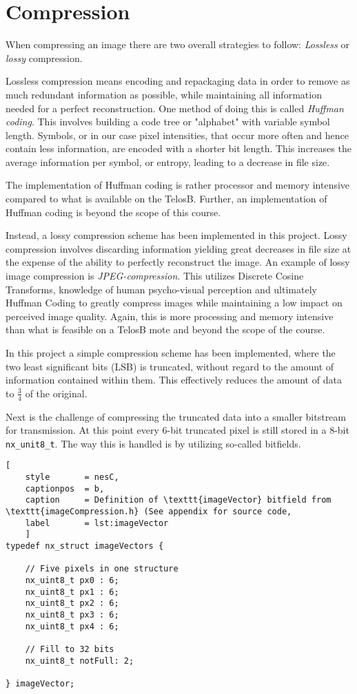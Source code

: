 \section{Compression}
When compressing an image there are two overall strategies to follow:
\emph{Lossless} or \emph{lossy} compression.

Lossless compression means encoding and repackaging data in order to remove as much redundant information as possible, while maintaining all information needed for a perfect reconstruction. 
One method of doing this is called \emph{Huffman coding}.
This involves building a code tree or "alphabet" with variable symbol length.
Symbols, or in our case pixel intensities, that occur more often and hence contain less information, are encoded with a shorter bit length. 
This increases the average information per symbol, or entropy, leading to a decrease in file size.

The implementation of Huffman coding is rather processor and memory intensive compared to what is available on the TelosB.
Further, an implementation of Huffman coding is beyond the scope of this course.

Instead, a lossy compression scheme has been implemented in this project.
Lossy compression involves discarding information yielding great decreases in file size at the expense of the ability to perfectly reconstruct the image.
An example of lossy image compression is \emph{JPEG-compression}.
This utilizes Discrete Cosine Transforms, knowledge of human psycho-visual perception and ultimately Huffman Coding to greatly compress images while maintaining a low impact on perceived image quality.
Again, this is more processing and memory intensive than what is feasible on a TelosB mote and beyond the scope of the course.

\newpage
In this project a simple compression scheme has been implemented, where the two least significant  bits (LSB) is truncated, without regard to the amount of information contained within them.
This effectively reduces the amount of data to $ \frac{3}{4} $ of the original. 

Next is the challenge of compressing the truncated data into a smaller bitstream for transmission.
At this point every 6-bit truncated pixel is still stored in a 8-bit \texttt{nx\_unit8\_t}.
The way this is handled is by utilizing so-called bitfields.


\begin{lstlisting}[
	style		= nesC, 
	captionpos	= b, 
	caption		= Definition of \texttt{imageVector} bitfield from \texttt{imageCompression.h} (See appendix for source code,
	label		= lst:imageVector
	]
typedef nx_struct imageVectors {
	
	// Five pixels in one structure
	nx_uint8_t px0 : 6;
	nx_uint8_t px1 : 6;
	nx_uint8_t px2 : 6;
	nx_uint8_t px3 : 6;
	nx_uint8_t px4 : 6;
	
	// Fill to 32 bits
	nx_uint8_t notFull: 2;
	
} imageVector;

\end{lstlisting}

